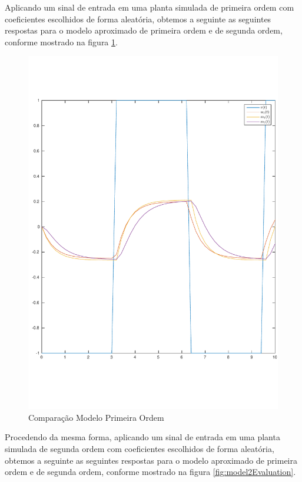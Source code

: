\documentclass[a4paper,11pt]{article}
\begin{document}
Aplicando um sinal de entrada em uma planta simulada de primeira ordem com coeficientes escolhidos de forma aleatória, obtemos a seguinte as seguintes respostas para o modelo aproximado de primeira ordem e de segunda ordem, conforme mostrado na figura \ref{fig:model1Evaluation}.

\begin{figure}[H]
    \centering
    \includegraphics[width=0.6\linewidth]{tex/img/model1Evaluation.pdf}
    \caption{Comparação Modelo Primeira Ordem}
    \label{fig:model1Evaluation}
\end{figure}

Procedendo da mesma forma, aplicando um sinal de entrada em uma planta simulada de segunda ordem com coeficientes escolhidos de forma aleatória, obtemos a seguinte as seguintes respostas para o modelo aproximado de primeira ordem e de segunda ordem, conforme mostrado na figura \ref{fig:model2Evaluation}.
\end{document}

